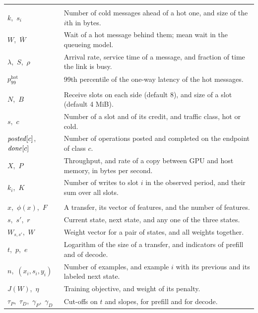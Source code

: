 \begin{tightblock}
\begin{longtable}{L{3.9cm}L{11.2cm}}
  \addlinespace
   \\*
  $k$,\ $s_i$ & Number of cold messages ahead of a hot one, and size of the $i$th in bytes. \\
  $W$,\ $\overline{W}$ & Wait of a hot message behind them; mean wait in the queueing model. \\
  $\lambda$,\ $S$,\ $\rho$ & Arrival rate, service time of a message, and fraction of time the link is busy. \\
  $p_{99}^{\text{hot}}$ & 99th percentile of the one-way latency of the hot messages. \\
  \addlinespace
   \\*
  $N$,\ $B$ & Receive slots on each side (default 8), and size of a slot (default 4 MiB). \\
  $s$,\ $c$ & Number of a slot and of its credit, and traffic class, hot or cold. \\
  $\mathit{posted}[c]$,\ $\mathit{done}[c]$ & Number of operations posted and completed on the endpoint of class $c$. \\
  $X$,\ $P$ & Throughput, and rate of a copy between GPU and host memory, in bytes per second. \\
  $k_i$,\ $K$ & Number of writes to slot $i$ in the observed period, and their sum over all slots. \\
  \addlinespace
   \\*
  $x$,\ $\phi(x)$,\ $F$ & A transfer, its vector of features, and the number of features. \\
  $s$,\ $s'$,\ $r$ & Current state, next state, and any one of the three states. \\
  $W_{s,s'}$,\ $W$ & Weight vector for a pair of states, and all weights together. \\
  $t$,\ $p$,\ $e$ & Logarithm of the size of a transfer, and indicators of prefill and of decode. \\
  $n$,\ $(x_i, s_i, y_i)$ & Number of examples, and example $i$ with its previous and its labeled next state. \\
  $J(W)$,\ $\eta$ & Training objective, and weight of its penalty. \\
  $\tau_P$,\ $\tau_D$,\ $\gamma_P$,\ $\gamma_D$ & Cut-offs on $t$ and slopes, for prefill and for decode. \\

\end{longtable}
\end{tightblock}
